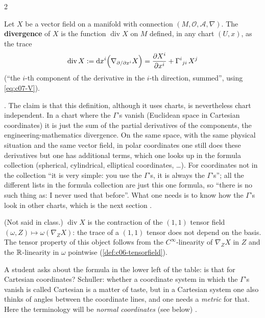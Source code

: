 \begin{paracol}{2}
\begin{definition}\label{def:c07-div}
Let $X$ be a vector field on a manifold with connection $(M,\mathcal O,\mathcal A,\nabla)$. The \textbf{divergence} of $X$ is the function $\operatorname{div}X$ on $M$ defined, in any chart $(U,x)$, as the trace
\[
  \operatorname{div}X:=\mathrm dx^i\Bigl(\nabla_{\partial/\partial x^i}X\Bigr)=\frac{\partial X^i}{\partial x^i}+\Gamma^i{}_{ji}\,X^j
\]
(``the $i$-th component of the derivative in the $i$-th direction, summed'', using \cref{eq:c07-V}).
\end{definition}
.
The claim is that this definition, although it uses charts, is nevertheless chart independent. In a chart where the $\Gamma$'s vanish (Euclidean space in Cartesian coordinates) it is just the sum of the partial derivatives of the components, the engineering-mathematics divergence. On the same space, with the same physical situation and the same vector field, in polar coordinates one still does these derivatives but one has additional terms, which one looks up in the formula collection (spherical, cylindrical, elliptical coordinates, \dots). For coordinates not in the collection ``it is very simple: you use the $\Gamma$'s, it is always the $\Gamma$'s''; all the different lists in the formula collection are just this one formula, so ``there is no such thing as: I never used that before''. What one needs is to know how the $\Gamma$'s look in other charts, which is the next section
.
\begin{coursenote}
(Not said in class.) $\operatorname{div}X$ is the contraction of the $(1,1)$ tensor field $(\omega,Z)\mapsto\omega(\nabla_ZX)$: the trace of a $(1,1)$ tensor does not depend on the basis. The tensor property of this object follows from the $C^\infty$-linearity of $\nabla_ZX$ in $Z$ and the $\mathbb{R}$-linearity in $\omega$ pointwise (\cref{def:c06-tensorfield}).
\end{coursenote}
\begin{coursenote}
A student asks about the formula in the lower left of the table: is that for Cartesian coordinates? Schuller: whether a coordinate system in which the $\Gamma$'s vanish is called Cartesian is a matter of taste, but in a Cartesian system one also thinks of angles between the coordinate lines, and one needs a \emph{metric} for that. Here the terminology will be \emph{normal coordinates} (see below)
.
\end{coursenote}


\end{paracol}
